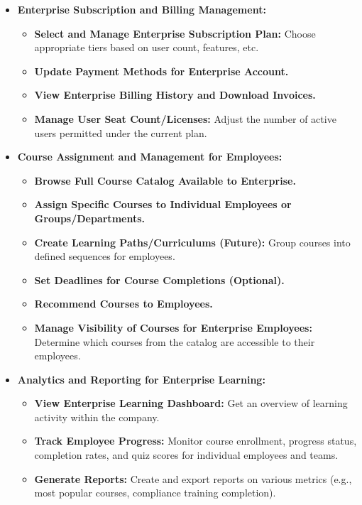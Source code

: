 \documentclass[12pt, a4paper]{report} %
\begin{document}
\begin{itemize}
\begin{itemize}
        \end{itemize}
    \item \textbf{Enterprise Subscription and Billing Management:}
        \begin{itemize}
            \item \textbf{Select and Manage Enterprise Subscription Plan:} Choose appropriate tiers based on user count, features, etc.
            \item \textbf{Update Payment Methods for Enterprise Account.}
            \item \textbf{View Enterprise Billing History and Download Invoices.}
            \item \textbf{Manage User Seat Count/Licenses:} Adjust the number of active users permitted under the current plan.
        \end{itemize}
    \item \textbf{Course Assignment and Management for Employees:}
        \begin{itemize}
            \item \textbf{Browse Full Course Catalog Available to Enterprise.}
            \item \textbf{Assign Specific Courses to Individual Employees or Groups/Departments.}
            \item \textbf{Create Learning Paths/Curriculums (Future):} Group courses into defined sequences for employees.
            \item \textbf{Set Deadlines for Course Completions (Optional).}
            \item \textbf{Recommend Courses to Employees.}
            \item \textbf{Manage Visibility of Courses for Enterprise Employees:} Determine which courses from the catalog are accessible to their employees.
        \end{itemize}
    \item \textbf{Analytics and Reporting for Enterprise Learning:}
        \begin{itemize}
            \item \textbf{View Enterprise Learning Dashboard:} Get an overview of learning activity within the company.
            \item \textbf{Track Employee Progress:} Monitor course enrollment, progress status, completion rates, and quiz scores for individual employees and teams.
            \item \textbf{Generate Reports:} Create and export reports on various metrics (e.g., most popular courses, compliance training completion).

\end{itemize}
\end{itemize}
\end{document}
